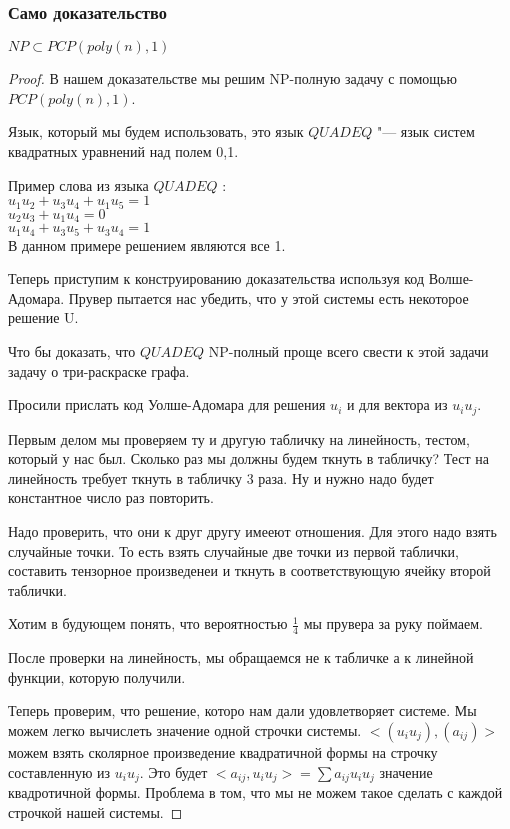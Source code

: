 \subsubsection{Само доказательство}
\begin{theorem}
	$NP \subset PCP(poly(n), 1)$\\
\end{theorem}
\begin{proof}
	В нашем доказательстве мы решим NP-полную задачу с помощью $PCP(poly(n), 1)$.

	Язык, который мы будем использовать, это язык $QUADEQ$ "--- язык 
	систем квадратных уравнений над полем {0,1}.

	\begin{exmp}
		Пример слова из языка $QUADEQ$ :\\
		$u_1u_2 + u_3u_4 + u_1u_5 = 1$\\
		$u_2u_3 + u_1u_4 = 0$\\
		$u_1u_4 + u_3u_5 + u_3u_4 = 1$\\

		В данном примере решением являются все 1.
	\end{exmp}

	Теперь приступим к конструированию доказательства используя код Волше-Адомара.
	Прувер пытается нас убедить, что у этой системы есть некоторое решение U.

	Что бы доказать, что $QUADEQ$ NP-полный проще всего свести к этой задачи задачу о три-раскраске 
	графа.

	Просили прислать код Уолше-Адомара для решения $u_i$ и для вектора из $u_iu_j$. 

	Первым делом мы проверяем ту и другую табличку на линейность, тестом, который у нас был. 
	Сколько раз мы должны будем ткнуть в табличку? Тест на линейность требует ткнуть в табличку 3 раза. 
	Ну и нужно надо будет константное число раз повторить. 

	Надо проверить, что они к друг другу имееют отношения. Для этого надо взять случайные точки. То есть 
	взять случайные две точки из первой таблички, составить тензорное произведенеи и 
	ткнуть в соответствующую ячейку второй таблички. 

	Хотим в будующем понять, что  вероятностью $\frac14$  мы прувера за руку поймаем. 

	После проверки на линейность, мы обращаемся не к табличке а к линейной функции, которую получили. 

	Теперь проверим, что решение, которо нам дали удовлетворяет системе. Мы можем легко вычислеть
	значение одной строчки системы. $<(u_iu_j), (a_{ij})>$  можем взять сколярное произведение квадратичной формы 
	на строчку составленную из $u_iu_j$. Это будет $<a_{ij}, u_iu_j > = \sum a_{ij}u_iu_j$ значение 
	квадротичной формы. Проблема в том, что мы не можем такое сделать с каждой строчкой нашей системы. 


\end{proof}
